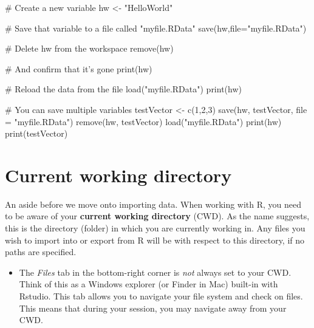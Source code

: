 \documentclass[a4paper]{book}
\newenvironment{Shaded}{}{}
\newcommand{\KeywordTok}[1]{\textcolor[rgb]{0.00,0.00,1.00}{{#1}}}
\newcommand{\DataTypeTok}[1]{{#1}}
\newcommand{\DecValTok}[1]{{#1}}
\newcommand{\StringTok}[1]{\textcolor[rgb]{0.00,0.50,0.50}{{#1}}}
\newcommand{\CommentTok}[1]{\textcolor[rgb]{0.00,0.50,0.00}{{#1}}}
\newcommand{\NormalTok}[1]{{#1}}
\newlength{\leftbarwidth}
\newlength{\leftbarsep}
\newcommand*{\leftbarcolorcmd}{\color{darkgray}}%
\renewenvironment{leftbar}{%
    \def\FrameCommand{{\leftbarcolorcmd{\vrule width \leftbarwidth\relax\hspace {\leftbarsep}}}}%
    \MakeFramed {\advance \hsize -\width \FrameRestore }%
}{%
    \endMakeFramed
}
\renewenvironment{Shaded}
{\vspace{0em}\begin{leftbar}\begin{snugshade}}
{\end{snugshade}\end{leftbar}\vspace{0pt}}
\newenvironment{rmdblock}[1]
  {\vspace{1.5em}\begin{shaded*}
  \begin{itemize}
  \renewcommand{\labelitemi}{
    \raisebox{-.7\height}[0pt][0pt]{
      {\setkeys{Gin}{width=3em,keepaspectratio}\texttt{[image: images/\#1]}}
    }
  }
  \item
  }
  {
  \end{itemize}
  \end{shaded*}
  }
\newenvironment{rmdcaution}
  {\begin{rmdblock}{caution}}
  {\end{rmdblock}}
\begin{document}
\begin{Shaded}
\begin{Highlighting}[]
\CommentTok{# Create a new variable}
\NormalTok{hw <-}\StringTok{ "HelloWorld"}

\CommentTok{# Save that variable to a file called "myfile.RData"}
\KeywordTok{save}\NormalTok{(hw,}\DataTypeTok{file=}\StringTok{"myfile.RData"}\NormalTok{)}

\CommentTok{# Delete hw from the workspace}
\KeywordTok{remove}\NormalTok{(hw)}

\CommentTok{# And confirm that it's gone}
\KeywordTok{print}\NormalTok{(hw)}

\CommentTok{# Reload the data from the file}
\KeywordTok{load}\NormalTok{(}\StringTok{"myfile.RData"}\NormalTok{)}
\KeywordTok{print}\NormalTok{(hw)}

\CommentTok{# You can save multiple variables}
\NormalTok{testVector <-}\StringTok{ }\KeywordTok{c}\NormalTok{(}\DecValTok{1}\NormalTok{,}\DecValTok{2}\NormalTok{,}\DecValTok{3}\NormalTok{)}
\KeywordTok{save}\NormalTok{(hw, testVector, }\DataTypeTok{file =} \StringTok{"myfile.RData"}\NormalTok{)}
\KeywordTok{remove}\NormalTok{(hw, testVector)}
\KeywordTok{load}\NormalTok{(}\StringTok{"myfile.RData"}\NormalTok{)}
\KeywordTok{print}\NormalTok{(hw)}
\KeywordTok{print}\NormalTok{(testVector)}
\end{Highlighting}
\end{Shaded}

\section{Current working directory}\label{current-working-directory}

An aside before we move onto importing data. When working with R, you
need to be aware of your \textbf{current working directory} (CWD). As
the name suggests, this is the directory (folder) in which you are
currently working in. Any files you wish to import into or export from R
will be with respect to this directory, if no paths are specified.

\begin{rmdcaution}
The \emph{Files} tab in the bottom-right corner is \emph{not} always set
to your CWD. Think of this as a Windows explorer (or Finder in Mac)
built-in with Rstudio. This tab allows you to navigate your file system
and check on files. This means that during your session, you may
navigate away from your CWD.
\end{rmdcaution}
\end{document}
